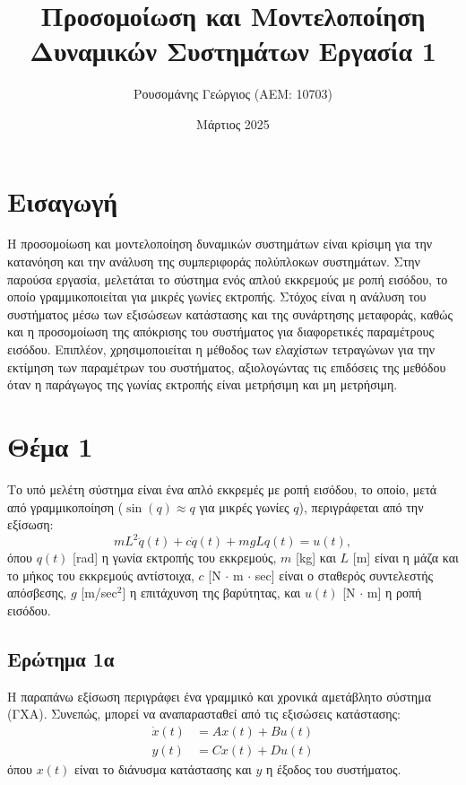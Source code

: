 \documentclass[a4paper,12pt]{article}
\title{Προσομοίωση και Μοντελοποίηση \newline Δυναμικών Συστημάτων \newline Εργασία 1}
\author{Ρουσομάνης Γεώργιος (ΑΕΜ: 10703)}
\date{Μάρτιος 2025}
\begin{document}
\maketitle

\section*{Εισαγωγή}
Η προσομοίωση και μοντελοποίηση δυναμικών συστημάτων είναι κρίσιμη για την κατανόηση και την ανάλυση της συμπεριφοράς πολύπλοκων συστημάτων. Στην παρούσα εργασία, μελετάται το σύστημα ενός απλού εκκρεμούς με ροπή εισόδου, το οποίο γραμμικοποιείται για μικρές γωνίες εκτροπής. Στόχος είναι η ανάλυση του συστήματος μέσω των εξισώσεων κατάστασης και της συνάρτησης μεταφοράς, καθώς και η προσομοίωση της απόκρισης του συστήματος για διαφορετικές παραμέτρους εισόδου. Επιπλέον, χρησιμοποιείται η μέθοδος των ελαχίστων τετραγώνων για την εκτίμηση των παραμέτρων του συστήματος, αξιολογώντας τις επιδόσεις της μεθόδου όταν η παράγωγος της γωνίας εκτροπής είναι μετρήσιμη και μη μετρήσιμη.

\section*{Θέμα 1}
Το υπό μελέτη σύστημα είναι ένα απλό εκκρεμές με ροπή εισόδου, το οποίο, μετά από γραμμικοποίηση ($\sin(q) \approx q$ για μικρές γωνίες $q$), περιγράφεται από την εξίσωση:
\begin{equation}
    mL^2\ddot{q}(t) + c\dot{q}(t) + mgLq(t) = u(t),
    \label{eq:system_differential_equation}
\end{equation}
όπου $q(t)$ [rad] η γωνία εκτροπής του εκκρεμούς, 
$m$ [kg] και $L$ [m] 
είναι η μάζα και το μήκος του εκκρεμούς αντίστοιχα, $c$ [N $\cdot$ m $\cdot$ sec] 
είναι ο σταθερός συντελεστής απόσβεσης, $g$ [m/sec$^2$] η επιτάχυνση της βαρύτητας, και $u(t)$ [N $\cdot$ m] η ροπή εισόδου.

\subsection*{Ερώτημα 1α}
Η παραπάνω εξίσωση περιγράφει ένα γραμμικό και χρονικά αμετάβλητο σύστημα (ΓΧΑ). Συνεπώς, μπορεί να αναπαρασταθεί από τις εξισώσεις κατάστασης:
\begin{equation}
\begin{aligned}
    \dot{x}(t) &= A x(t) + B u(t) \\
    y(t) &= C x(t) + D u(t)
\end{aligned}
\label{eq:system_states}
\end{equation}
όπου $x(t)$ είναι το διάνυσμα κατάστασης και $y$ η έξοδος του συστήματος.
\end{document}
